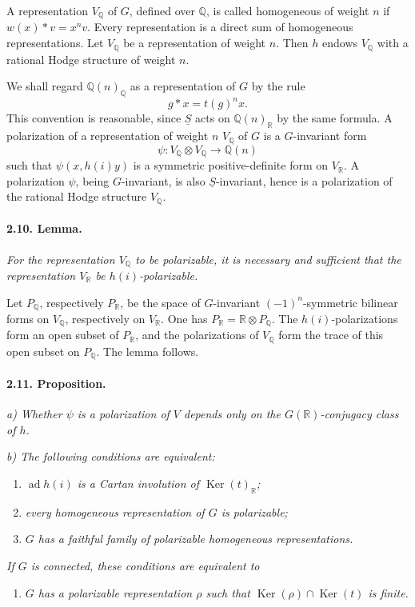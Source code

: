 \documentclass[10pt]{article}
\newcommand{\Q}{\mathbb{Q}}
\newcommand{\R}{\mathbb{R}}
\newcommand{\Ker}{\operatorname{Ker}}
\newcommand{\ad}{\operatorname{ad}}
\begin{document}
A representation $V_\Q$ of $G$, defined over $\Q$, is called homogeneous of weight $n$ if $w(x)*v=x^n v$. Every representation is a direct sum of homogeneous representations. Let $V_\Q$ be a representation of weight $n$. Then $h$ endows $V_\Q$ with a rational Hodge structure of weight $n$.

We shall regard $\Q(n)_\Q$ as a representation of $G$ by the rule
\[
g*x=t(g)^n x.
\]
This convention is reasonable, since $\underline S$ acts on $\Q(n)_\R$ by the same formula. A polarization of a representation of weight $n$ $V_\Q$ of $G$ is a $G$-invariant form
\[
\psi:V_\Q\otimes V_\Q\longrightarrow\Q(n)
\]
such that $\psi(x,h(i)y)$ is a symmetric positive-definite form on $V_\R$. A polarization $\psi$, being $G$-invariant, is also $\underline S$-invariant, hence is a polarization of the rational Hodge structure $V_\Q$.

\paragraph{2.10. Lemma.} \emph{For the representation $V_\Q$ to be polarizable, it is necessary and sufficient that the representation $V_\R$ be $h(i)$-polarizable.}

Let $P_\Q$, respectively $P_\R$, be the space of $G$-invariant $(-1)^n$-symmetric bilinear forms on $V_\Q$, respectively on $V_\R$. One has $P_\R=\R\otimes P_\Q$. The $h(i)$-polarizations form an open subset of $P_\R$, and the polarizations of $V_\Q$ form the trace of this open subset on $P_\Q$. The lemma follows.

\paragraph{2.11. Proposition.} \emph{a) Whether $\psi$ is a polarization of $V$ depends only on the $G(\R)$-conjugacy class of $h$.}

\emph{b) The following conditions are equivalent:}
\begin{enumerate}[label=(\roman*)]
\item \emph{$\ad h(i)$ is a Cartan involution of $\Ker(t)_\R$;}
\item \emph{every homogeneous representation of $G$ is polarizable;}
\item \emph{$G$ has a faithful family of polarizable homogeneous representations.}
\end{enumerate}
\emph{If $G$ is connected, these conditions are equivalent to}
\begin{enumerate}[label=(iii\textquotesingle)]
\item \emph{$G$ has a polarizable representation $\rho$ such that $\Ker(\rho)\cap\Ker(t)$ is finite.}
\end{enumerate}
\end{document}
